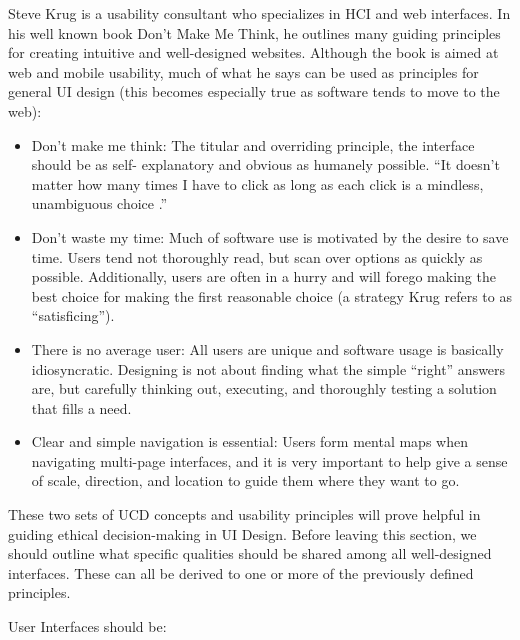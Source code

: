 \documentclass[12pt, oneside]{article}
\begin{document}
Steve Krug is a usability consultant who specializes in HCI and web interfaces. In his well known book Don't Make Me Think, he outlines many guiding principles for creating intuitive and well-designed websites. Although the book is aimed at web and mobile usability, much of what he says can be used as principles for general UI design (this becomes especially true as software tends to move to the web):

\begin{itemize}
\raggedright
    \item Don't make me think: The titular and overriding principle, the interface should be as self- explanatory and obvious as humanely possible. ``It doesn't matter how many times I have to click as long as each click is a mindless, unambiguous choice \cite[p.~43]{krug_2014}.''
    \item Don't waste my time: Much of software use is motivated by the desire to save time. Users tend not thoroughly read, but scan over options as quickly as possible. Additionally, users are often in a hurry and will forego making the best choice for making the first reasonable choice (a strategy Krug refers to as ``satisficing'').
    \item There is no average user: All users are unique and software usage is basically idiosyncratic. Designing is not about finding what the simple ``right'' answers are, but carefully thinking out, executing, and thoroughly testing a solution that fills a need.
    \item Clear and simple navigation is essential: Users form mental maps when navigating multi-page interfaces, and it is very important to help give a sense of scale, direction, and location to guide them where they want to go.
\end{itemize}

These two sets of UCD concepts and usability principles will prove helpful in guiding ethical decision-making in UI Design. Before leaving this section, we should outline what specific qualities should be shared among all well-designed interfaces. These can all be derived to one or more of the previously defined principles.

User Interfaces should be:
\end{document}
